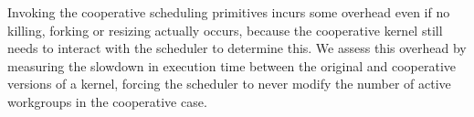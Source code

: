 \documentclass[parskip=half,sigconf,review, anonymous=true, acmcopyrightmode=none]{acmart}
\begin{document}

%
%
%

Invoking the cooperative scheduling primitives incurs some overhead
even if no killing, forking or resizing actually occurs, because the cooperative kernel still needs to interact with the scheduler to determine this.
We assess this overhead by measuring the
 slowdown in execution time between the original and cooperative versions of a kernel, forcing the scheduler to never modify the number of
active workgroups in the cooperative case.
\end{document}
